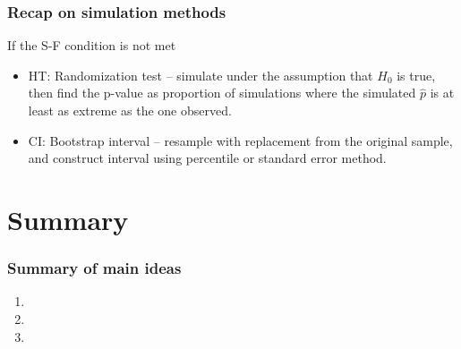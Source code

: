 \documentclass[11pt,containsverbatim,handout,xcolor=xelatex,dvipsnames,table]{beamer}
\begin{document}
\begin{frame}
\frametitle{Recap on simulation methods}

If the S-F condition is not met

\begin{itemize}

\item HT: Randomization test -- simulate under the assumption that $H_0$ is true, then find the p-value as 
proportion of simulations where the simulated $\hat{p}$ is at least as extreme as the one observed.

\item CI: Bootstrap interval -- resample with replacement from the original sample, and construct interval 
using percentile or standard error method.

\end{itemize}


\end{frame}


\section{Summary}


\begin{frame}
\frametitle{Summary of main ideas}

\vfill

\begin{enumerate}

\item {}

\item {}

\item {}

\end{enumerate}

\vfill

\end{frame}

\end{document}
